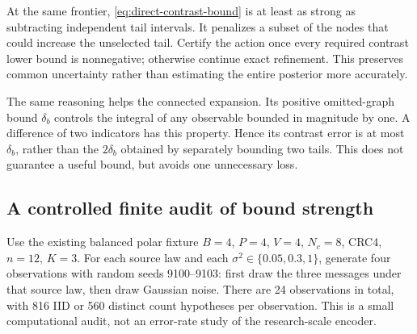 \documentclass[10pt,a4paper]{article}
\begin{document}
At the same frontier, \eqref{eq:direct-contrast-bound} is at least as strong as subtracting independent tail
intervals. It penalizes a subset of the nodes that could increase the unselected tail.
Certify the action once every required contrast lower bound is nonnegative; otherwise continue exact refinement.
This preserves common uncertainty rather than estimating the entire posterior more accurately.

The same reasoning helps the connected expansion. Its positive omitted-graph bound $\delta_b$ controls the
integral of any observable bounded in magnitude by one. A difference of two indicators has this property.
Hence its contrast error is at most $\delta_b$, rather than the $2\delta_b$ obtained by separately bounding
two tails. This does not guarantee a useful bound, but avoids one unnecessary loss.

\clearpage
\subsection{A controlled finite audit of bound strength}
Use the existing balanced polar fixture $B=4$, $P=4$, $V=4$, $N_c=8$, CRC4, $n=12$, $K=3$.
For each source law and each $\sigma^2\in\{0.05,0.3,1\}$, generate four observations with random seeds
9100--9103: first draw the three messages under that source law, then draw Gaussian noise.
There are 24 observations in total, with 816 IID or 560 distinct count hypotheses per observation.
This is a small computational audit, not an error-rate study of the research-scale encoder.
\end{document}
